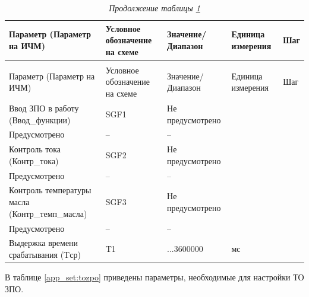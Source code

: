 \footnotesize
\begin{longtable}{|>{\centering\arraybackslash}m{5.3cm}|>{\centering\arraybackslash}m{3.3cm}|>{\centering\arraybackslash}m{4.2cm}|>{\centering\arraybackslash}m{1.8cm}|>{\centering\arraybackslash}m{1cm}|}
\caption{Параметры для настройки ЗПО\hfill\vspace{-0.5\baselineskip}}\label{app_set:zpo}\\ 
\hline
\rowcolor{unimain!40}
Параметр (Параметр на ИЧМ) & Условное обозначение на схеме & Значение/ Диапазон & Единица измерения & Шаг \\ 
\hline
\endfirsthead
\caption*{\hspace{3pt}\emph{Продолжение таблицы \ref{app_set:zpo}\hfill\vspace{-0.5\baselineskip}}} \\ %
\hline
\rowcolor{unimain!40}
Параметр (Параметр на ИЧМ) & Условное обозначение на схеме & Значение/ Диапазон & Единица измерения & Шаг \\ 
\endhead
\endfoot
\endlastfoot
\centering Ввод ЗПО в работу (Ввод\_функции)  & \centering SGF1 & \centering Не предусмотрено \\ Предусмотрено & \centering -- & \centering \arraybackslash -- \\
\hline
\centering Контроль тока (Контр\_тока)  & \centering SGF2 & \centering Не предусмотрено \\ Предусмотрено & \centering -- & \centering \arraybackslash -- \\
\hline
\centering Контроль температуры масла (Контр\_темп\_масла)  & \centering SGF3 & \centering Не предусмотрено \\ Предусмотрено & \centering -- & \centering \arraybackslash -- \\
\hline
\centering Выдержка времени срабатывания (Tср)  & \centering T1 & \centering 0...3600000 & \centering мс & \centering \arraybackslash 1000 \\
\hline
\end{longtable}
\normalsize

\par
В таблице \ref{app_set:tozpo} приведены параметры, необходимые для настройки ТО ЗПО.


